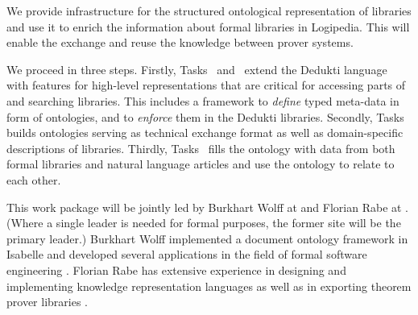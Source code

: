 \begin{workpackage}[id=structuring,type=RTD,
  short={Structure of the encyclopedia},%
  title={Structure of the encyclopedia},
  lead=FAU,
  SacRM=40,
  FauRM=20,
  BolRM=4
]



\begin{wpobjectives}
We provide infrastructure for the structured ontological representation of libraries and use it to enrich the information about formal libraries in Logipedia.
This will enable the exchange and reuse the knowledge between prover systems.
\end{wpobjectives}


\begin{wpdescription}
We proceed in three steps.
Firstly, Tasks~ and~ extend the Dedukti language with features for high-level representations that are critical for accessing parts of and searching libraries.
This includes a framework to \emph{define} typed meta-data in form of ontologies, and to \emph{enforce} them in 
the Dedukti libraries.
Secondly, Tasks~ builds ontologies serving as technical exchange format as well as domain-specific descriptions of libraries.
Thirdly, Tasks~ fills the ontology with data from both formal libraries and natural language articles and use the ontology to relate to each other.

This work package will be jointly led by Burkhart Wolff at  and Florian Rabe at .
(Where a single leader is needed for formal purposes, the former site will be the primary leader.)
Burkhart Wolff implemented a document ontology framework in Isabelle and developed several applications
in the field of formal software engineering \cite{brucker.ea:ontologies-certification:2019,brucker.ea:isabelle-ontologies:2018,brucker.ea:ontologies-certification:2019}.
Florian Rabe has extensive experience in designing and implementing knowledge representation languages \cite{RK:mmt:10,rabe:recon:17} as well as in exporting theorem prover libraries \cite{KR:oafexp:20,CKMRSW:ulo:19}.
\end{wpdescription}


\end{workpackage}
